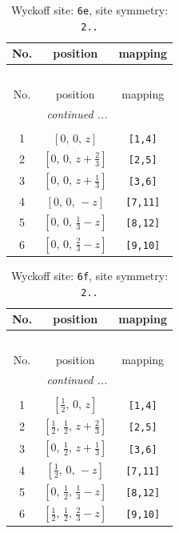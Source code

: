 \documentclass[fleqn,8pt]{jsarticle}
\begin{document}
\begin{longtable}{ccc}
\caption{Wyckoff site: {\tt 6e}, site symmetry: {\tt 2..}}
 \\
 \hline \hline
No. & position & mapping \\ \hline \endfirsthead

\multicolumn{2}{l}{\tablename\ \thetable{}} \\
 \hline \hline
No. & position & mapping \\ \hline \endhead

 \hline \hline
\multicolumn{2}{r}{\footnotesize\it continued ...} \\ \endfoot

 \hline \hline
\multicolumn{2}{r}{} \\ \endlastfoot

1 & $\left[ 0,\, 0,\, z \right]$ & {\tt [1,4]} \\ \hline
2 & $\left[ 0,\, 0,\, z + \frac{2}{3} \right]$ & {\tt [2,5]} \\ \hline
3 & $\left[ 0,\, 0,\, z + \frac{1}{3} \right]$ & {\tt [3,6]} \\ \hline
4 & $\left[ 0,\, 0,\, - z \right]$ & {\tt [7,11]} \\ \hline
5 & $\left[ 0,\, 0,\, \frac{1}{3} - z \right]$ & {\tt [8,12]} \\ \hline
6 & $\left[ 0,\, 0,\, \frac{2}{3} - z \right]$ & {\tt [9,10]} \\
\end{longtable}
\renewcommand{\arraystretch}{1.2}
\begin{longtable}{ccc}
\caption{Wyckoff site: {\tt 6f}, site symmetry: {\tt 2..}}
 \\
 \hline \hline
No. & position & mapping \\ \hline \endfirsthead

\multicolumn{2}{l}{\tablename\ \thetable{}} \\
 \hline \hline
No. & position & mapping \\ \hline \endhead

 \hline \hline
\multicolumn{2}{r}{\footnotesize\it continued ...} \\ \endfoot

 \hline \hline
\multicolumn{2}{r}{} \\ \endlastfoot

1 & $\left[ \frac{1}{2},\, 0,\, z \right]$ & {\tt [1,4]} \\ \hline
2 & $\left[ \frac{1}{2},\, \frac{1}{2},\, z + \frac{2}{3} \right]$ & {\tt [2,5]} \\ \hline
3 & $\left[ 0,\, \frac{1}{2},\, z + \frac{1}{3} \right]$ & {\tt [3,6]} \\ \hline
4 & $\left[ \frac{1}{2},\, 0,\, - z \right]$ & {\tt [7,11]} \\ \hline
5 & $\left[ 0,\, \frac{1}{2},\, \frac{1}{3} - z \right]$ & {\tt [8,12]} \\ \hline
6 & $\left[ \frac{1}{2},\, \frac{1}{2},\, \frac{2}{3} - z \right]$ & {\tt [9,10]} \\
\end{longtable}
\end{document}

